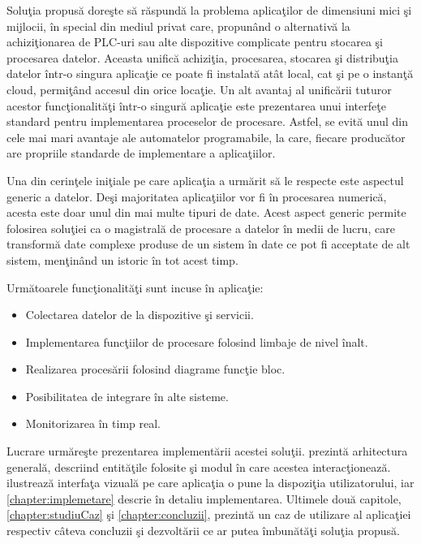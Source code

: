 Soluţia propusă doreşte să răspundă la problema aplicaţilor de dimensiuni mici şi mijlocii, în special din mediul privat care, propunând o alternativă la achiziţionarea de PLC-uri sau alte dispozitive complicate pentru stocarea şi procesarea datelor. Aceasta unifică achiziţia, procesarea, stocarea şi distribuţia datelor într-o singura aplicaţie ce poate fi instalată atât local, cat şi pe o instanţă cloud, permiţând accesul din orice locaţie. Un alt avantaj al unificării tuturor acestor funcţionalităţi într-o singură aplicaţie este prezentarea unui interfeţe standard pentru implementarea proceselor de procesare. Astfel, se evită unul din cele mai mari avantaje ale automatelor programabile, la care, fiecare producător are propriile standarde de implementare a aplicaţiilor.

Una din cerinţele iniţiale pe care aplicaţia a urmărit să le respecte este aspectul generic a datelor. Deşi majoritatea aplicaţiilor vor fi în procesarea numerică, acesta este doar unul din mai multe tipuri de date. Acest aspect generic permite folosirea soluţiei ca o magistrală de procesare a datelor în medii de lucru, care transformă date complexe produse de un sistem în date ce pot fi acceptate de alt sistem, menţinând un istoric în tot acest timp.

Următoarele funcţionalităţi sunt incuse în aplicaţie:
\begin{itemize}
	\item Colectarea datelor de la dispozitive şi servicii.
	\item Implementarea funcţiilor de procesare folosind limbaje de nivel înalt.
	\item Realizarea procesării folosind diagrame funcţie bloc.
	\item Posibilitatea de integrare în alte sisteme.
	\item Monitorizarea în timp real.
\end{itemize}

Lucrare urmăreşte prezentarea implementării acestei soluţii.  prezintă arhitectura generală, descriind entităţile folosite şi modul în care acestea interacţionează.  ilustrează interfaţa vizuală pe care aplicaţia o pune la dispoziţia utilizatorului, iar \cref{chapter:implemetare} descrie în detaliu implementarea. Ultimele două capitole, \ref{chapter:studiuCaz} şi \ref{chapter:concluzii}, prezintă un caz de utilizare al aplicaţiei respectiv câteva concluzii şi dezvoltării ce ar putea îmbunătăţi soluţia propusă.